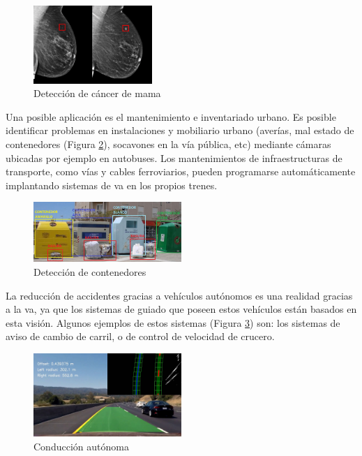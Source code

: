 \begin{figure}[H]
  \begin{center}
    \includegraphics[width=0.4\textwidth]{figures/introduccion/cancer.png}
		\caption{Detección de cáncer de mama}
		\label{fig.cancer}
		\end{center}
\end{figure}


Una posible aplicación es el mantenimiento e inventariado urbano. Es posible identificar problemas en instalaciones y mobiliario urbano (averías, mal estado de contenedores (Figura \ref{fig.contenedor}), socavones en la vía pública, etc) mediante cámaras ubicadas por ejemplo en autobuses. Los mantenimientos de infraestructuras de transporte, como vías y cables ferroviarios, pueden programarse automáticamente implantando sistemas de \acrshort{va} en los propios trenes. 


\begin{figure}[H]
  \begin{center}
    \includegraphics[width=0.5\textwidth]{figures/introduccion/contenedor.png}
		\caption{Detección de contenedores}
		\label{fig.contenedor}
		\end{center}
\end{figure}

La reducción de accidentes gracias a vehículos autónomos es una realidad gracias a la \acrshort{va}, ya que los sistemas de guiado que poseen estos vehículos están basados en esta visión. Algunos ejemplos de estos sistemas (Figura \ref{fig.car}) son: los sistemas de aviso de cambio de carril, o de control de velocidad de crucero. 

\begin{figure}[H]
  \begin{center}
    \includegraphics[width=0.5\textwidth]{figures/introduccion/car.jpg}
		\caption{Conducción autónoma}
		\label{fig.car}
		\end{center}
\end{figure}

